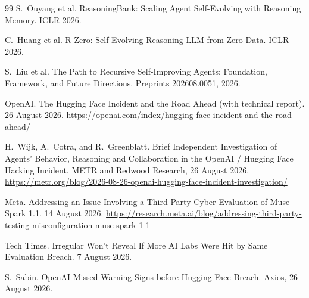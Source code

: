 \documentclass[11pt,a4paper]{article}
\begin{document}
\begin{thebibliography}{99}
 S.~Ouyang et al. ReasoningBank: Scaling Agent Self-Evolving with Reasoning Memory. ICLR 2026.

 C.~Huang et al. R-Zero: Self-Evolving Reasoning LLM from Zero Data. ICLR 2026.

 S.~Liu et al. The Path to Recursive Self-Improving Agents: Foundation, Framework, and Future Directions. Preprints 202608.0051, 2026.

 OpenAI. The Hugging Face Incident and the Road Ahead (with technical report). 26 August 2026. \url{https://openai.com/index/hugging-face-incident-and-the-road-ahead/}

 H.~Wijk, A.~Cotra, and R.~Greenblatt. Brief Independent Investigation of Agents' Behavior, Reasoning and Collaboration in the OpenAI / Hugging Face Hacking Incident. METR and Redwood Research, 26 August 2026. \url{https://metr.org/blog/2026-08-26-openai-hugging-face-incident-investigation/}

 Meta. Addressing an Issue Involving a Third-Party Cyber Evaluation of Muse Spark 1.1. 14 August 2026. \url{https://research.meta.ai/blog/addressing-third-party-testing-misconfiguration-muse-spark-1-1}

 Tech Times. Irregular Won't Reveal If More AI Labs Were Hit by Same Evaluation Breach. 7 August 2026.

 S.~Sabin. OpenAI Missed Warning Signs before Hugging Face Breach. Axios, 26 August 2026.

\end{thebibliography}
\end{document}
